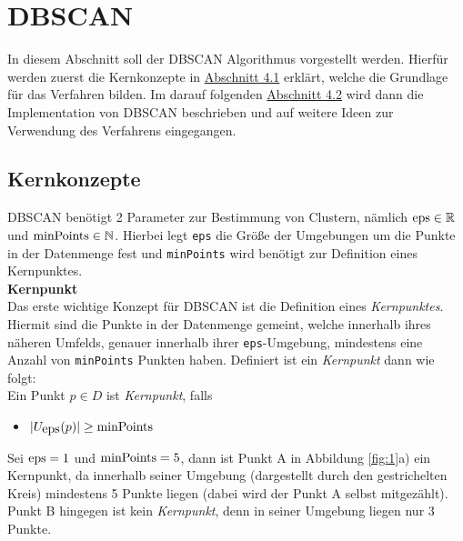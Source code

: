\documentclass{lni}
\begin{document}
%
%

\section{DBSCAN}
In diesem Abschnitt soll der DBSCAN Algorithmus vorgestellt werden.
Hierfür werden zuerst die Kernkonzepte in \hyperref[sec:kern]{Abschnitt 4.1} erklärt, welche die Grundlage für das Verfahren bilden. Im darauf folgenden \hyperref[sec:impl]{Abschnitt 4.2} wird dann die Implementation von DBSCAN beschrieben und auf weitere Ideen zur Verwendung des Verfahrens eingegangen.

%
%

\subsection{Kernkonzepte}
\label{sec:kern}
DBSCAN benötigt 2 Parameter zur Bestimmung von Clustern, nämlich $\lstinline{eps} \in \mathbb{R}$ und $\lstinline{minPoints} \in \mathbb{N}$. Hierbei legt \lstinline{eps} die Größe der Umgebungen um die Punkte in der Datenmenge fest und \lstinline{minPoints} wird benötigt zur Definition eines Kernpunktes.\\


\textbf{Kernpunkt}\\
Das erste wichtige Konzept für DBSCAN ist die Definition eines \textit{Kernpunktes}. Hiermit sind die Punkte in der Datenmenge gemeint, welche innerhalb ihres näheren Umfelds, genauer innerhalb ihrer \lstinline{eps}-Umgebung, mindestens eine Anzahl von \lstinline{minPoints} Punkten haben. Definiert ist ein \textit{Kernpunkt} dann wie folgt:\\
Ein Punkt $ p \in D $ ist \textit{Kernpunkt}, falls
\begin{itemize}
    \item $ | U_{\lstinline{eps}}(p) | \geq \lstinline{minPoints}  $
\end{itemize}
Sei $\lstinline{eps} = 1$ und $\lstinline{minPoints} = 5$, dann ist Punkt A in Abbildung \ref{fig:1}a) ein Kernpunkt, da innerhalb seiner Umgebung (dargestellt durch den gestrichelten Kreis) mindestens 5 Punkte liegen (dabei wird der Punkt A selbst mitgezählt). Punkt B hingegen ist kein \textit{Kernpunkt}, denn in seiner Umgebung liegen nur 3 Punkte.\\

\end{document}
